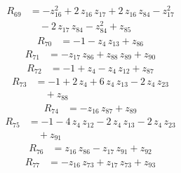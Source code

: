 \begin{equation*}\begin{aligned}
R_{69}&=-z_{16}^{2} +2\,z_{16}\,z_{17} +2\,z_{16}\,z_{84} -z_{17}^{2} \\
&\quad -2\,z_{17}\,z_{84} -z_{84}^{2} +z_{85}
\end{aligned}\end{equation*}
\begin{equation*}\begin{aligned}
R_{70}&=-1 -z_{4}\,z_{13} +z_{86}
\end{aligned}\end{equation*}
\begin{equation*}\begin{aligned}
R_{71}&=-z_{17}\,z_{86} +z_{88}\,z_{89} +z_{90}
\end{aligned}\end{equation*}
\begin{equation*}\begin{aligned}
R_{72}&=-1 +z_{4} -z_{4}\,z_{12} +z_{87}
\end{aligned}\end{equation*}
\begin{equation*}\begin{aligned}
R_{73}&=-1 +2\,z_{4} +6\,z_{4}\,z_{13} -2\,z_{4}\,z_{23} \\
&\quad +z_{88}
\end{aligned}\end{equation*}
\begin{equation*}\begin{aligned}
R_{74}&=-z_{16}\,z_{87} +z_{89}
\end{aligned}\end{equation*}
\begin{equation*}\begin{aligned}
R_{75}&=-1 -4\,z_{4}\,z_{12} -2\,z_{4}\,z_{13} -2\,z_{4}\,z_{23} \\
&\quad +z_{91}
\end{aligned}\end{equation*}
\begin{equation*}\begin{aligned}
R_{76}&=z_{16}\,z_{86} -z_{17}\,z_{91} +z_{92}
\end{aligned}\end{equation*}
\begin{equation*}\begin{aligned}
R_{77}&=-z_{16}\,z_{73} +z_{17}\,z_{73} +z_{93}
\end{aligned}\end{equation*}
